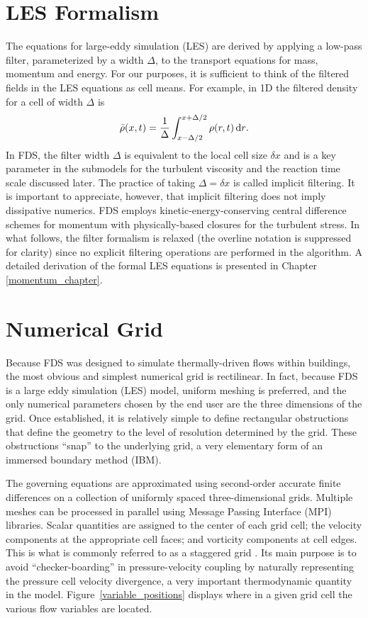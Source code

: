 \section{LES Formalism}
\label{filteredfields}

The equations for large-eddy simulation (LES) are derived by applying a low-pass filter, parameterized by a width $\Delta$, to the transport equations for mass, momentum and energy.  For our purposes, it is sufficient to think of the filtered fields in the LES equations as cell means.  For example, in 1D the filtered density for a cell of width $\Delta$ is
\begin{equation}
\label{eqn_filtered_density}
\bar{\rho}(x,t) = \frac{1}{\Delta}\int_{x-\Delta/2}^{x+\Delta/2} \rho(r,t) \,\mathrm{d} r \mbox{.}
\end{equation}
In FDS, the filter width $\Delta$ is equivalent to the local cell size $\delta x$ and is a key parameter in the submodels for the turbulent viscosity and the reaction time scale discussed later.  The practice of taking $\Delta = \delta x$ is called implicit filtering.  It is important to appreciate, however, that implicit filtering does not imply dissipative numerics.  FDS employs kinetic-energy-conserving central difference schemes for momentum with physically-based closures for the turbulent stress.  In what follows, the filter formalism is relaxed (the overline notation is suppressed for clarity) since no explicit filtering operations are performed in the algorithm.  A detailed derivation of the formal LES equations is presented in Chapter \ref{momentum_chapter}.

\section{Numerical Grid}
\label{govequations}

Because FDS was designed to simulate thermally-driven flows within buildings, the most obvious and simplest numerical grid is rectilinear. In fact, because FDS is a large eddy simulation (LES) model, uniform meshing is preferred, and the only numerical parameters chosen by the end user are the three dimensions of the grid. Once established, it is relatively simple to define rectangular obstructions that define the geometry to the level of resolution determined by the grid. These obstructions ``snap'' to the underlying grid, a very elementary form of an immersed boundary method (IBM).

The governing equations are approximated using second-order accurate finite differences on a collection of uniformly spaced three-dimensional grids. Multiple meshes can be processed in parallel using Message Passing Interface (MPI) libraries. Scalar quantities are assigned to the center of each grid cell; the velocity components at the appropriate cell faces; and vorticity components at cell edges. This is what is commonly referred to as a staggered grid \cite{Harlow:1,Morinishi}.  Its main purpose is to avoid ``checker-boarding'' in pressure-velocity coupling by naturally representing the pressure cell velocity divergence, a very important thermodynamic quantity in the model. Figure~\ref{variable_positions} displays where in a given grid cell the various flow variables are located.


